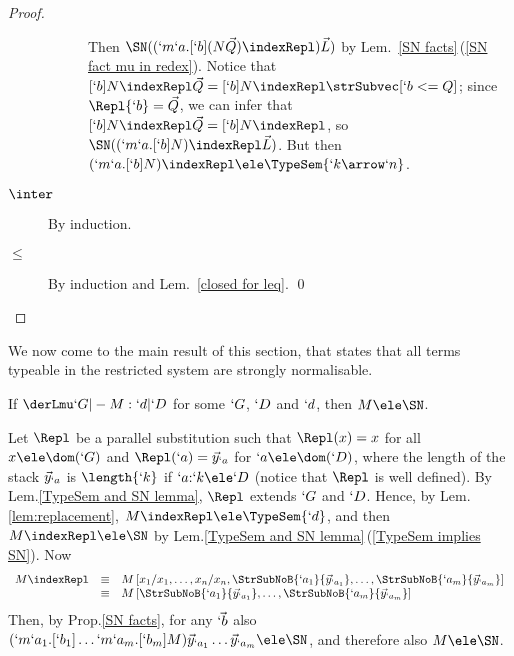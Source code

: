 \documentclass{lmcs}
\newcommand{\vect}[1]{\vec{#1}}
\begin{document}
\begin{proof}
\begin{description}
\begin{description}
Then $ \SN({ (`m`a.[`b](N\vect{Q}){\indexRepl})\vect{L} }) $ by Lem.~\ref{SN facts}\,(\ref{SN fact mu in redex}).
Notice that $[`b]N{\indexRepl} \vect{Q} = [`b]N{\indexRepl} \strSubvec[ `b <= Q ] $; since $\Repl{`b} = \vect{Q}$, we can infer that $[`b]N{\indexRepl} \vect{Q} = [`b]N{\indexRepl} $, so $ \SN({ (`m`a.[`b]N){\indexRepl} \vect{L} }) $.
But then $ (`m`a.[`b]N){\indexRepl} \ele \TypeSem{`k\arrow`n} $.
\end{description}


 \item[$\inter$]
By induction.

 \item[$\leq$]
By induction and Lem.~\ref{closed for leq}.
\qed 

 \end{description}
\end{proof} 

We now come to the main result of this section, that states that all terms typeable in the restricted system are strongly normalisable.


 \begin{thm} \label{thm:typableAreSN}
If $\derLmu `G |- M : `d | `D $ for some $`G$, $`D $ and $`d$, then $M \ele \SN$.
 \end{thm}

 \begin{Proof}
Let $ \Repl $ be a parallel substitution such that $ \Repl (x) = x $ for all $ x \ele \dom(`G)$ and $ \Repl (`a) = \vect{y}_{`a} $ for $ `a \ele \dom(`D) $, where the length of the stack $ \vect{y}_{`a}$ is $\length{`k}$ if $`a{:}`k \ele `D $
(notice that $\Repl$ is well defined).
By Lem.\skp\ref{TypeSem and SN lemma}, $ \Repl $ extends $`G$ and $`D $.
Hence, by Lem.\skp\ref{lem:replacement}, $M \indexRepl \ele \TypeSem{`d}$,
and then $M \indexRepl \ele \SN$ by Lem.\skp\ref{TypeSem and SN lemma}\,(\ref{TypeSem implies SN}).
Now 
%
 \[ \begin{array}{rcl}
M \indexRepl 
	&\equiv& 
M \,[ x_1/ x_1, \ldots, x_n/x_n, \StrSubNoB{`a_1}{\vect{y}_{`a_1}}, \ldots, \StrSubNoB{`a_m}{\vect{y}_{`a_m}}] \\
	&\equiv& 
M \,[ \StrSubNoB{`a_1}{\vect{y}_{`a_1}}, \ldots, \StrSubNoB{`a_m}{\vect{y}_{`a_m}}] 
 \end{array} \]
Then, by Prop.\skp\ref{SN facts}, for any $\vect{`b}$ also $(`m`a_1.[`b_1]\dots `m`a_m.[`b_m]M) \vect{y}_{`a_1} \dots \vect{y}_{`a_m} \ele \SN$, and therefore also $M \ele \SN$. %
 \end{Proof}
\end{document}

